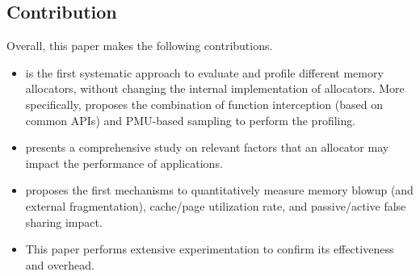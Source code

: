 
\subsection*{Contribution}

Overall, this paper makes the following contributions. 

\begin{itemize}
\item \MP{} is the first systematic approach to evaluate and profile different memory allocators, without changing the internal implementation of allocators. More specifically, \MP{} proposes the combination of function interception (based on common APIs) and PMU-based sampling to perform the profiling.


\item \MP{} presents a comprehensive study on relevant factors that an allocator may impact the performance of applications.

\item \MP{} proposes the first mechanisms to quantitatively measure memory blowup (and external fragmentation), cache/page utilization rate, and passive/active false sharing impact. 
\item This paper performs extensive experimentation to confirm its effectiveness and overhead.    

\end{itemize} 

